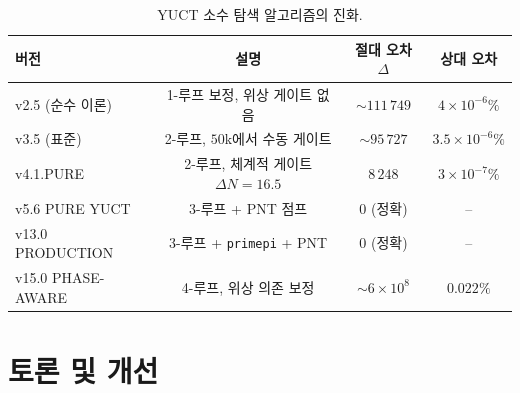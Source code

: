 \documentclass[11pt,a4paper]{article}
\begin{document}
	\begin{table}[htbp]
		\centering
		\caption{YUCT 소수 탐색 알고리즘의 진화.}
		\label{tab:all-versions}
		\begin{tabular}{l c c c}
			\toprule
			버전 & 설명 & 절대 오차 \(\Delta\) & 상대 오차 \\
			\midrule
			v2.5 (순수 이론)  & 1-루프 보정, 위상 게이트 없음 & \(\sim 111\,749\) & \(4\times10^{-6}\%\) \\
			v3.5 (표준)    & 2-루프, \(50\)k에서 수동 게이트 & \(\sim 95\,727\) & \(3.5\times10^{-6}\%\) \\
			v4.1.PURE       & 2-루프, 체계적 게이트 \(\Delta N=16.5\) & \(8\,248\) & \(3\times10^{-7}\%\) \\
			v5.6 PURE YUCT  & 3-루프 + PNT 점프 & 0 (정확) & -- \\
			v13.0 PRODUCTION & 3-루프 + \texttt{primepi} + PNT & 0 (정확) & -- \\
			v15.0 PHASE-AWARE & 4-루프, 위상 의존 보정 & \(\sim 6\times10^{8}\) & \(0.022\%\) \\
			\bottomrule
		\end{tabular}
	\end{table}
	
	\section{토론 및 개선}
	\label{sec:discussion}
	
\end{document}

